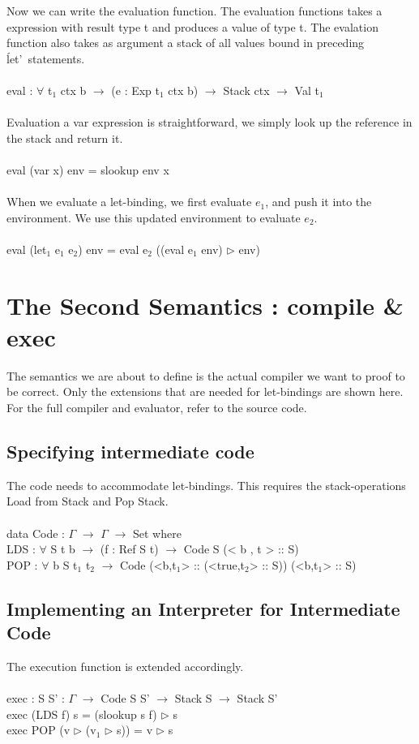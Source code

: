 \documentclass[paper=a4, fontsize=11pt]{scrartcl} %
\numberwithin{equation}{section} %
\numberwithin{figure}{section} %
\numberwithin{table}{section} %
\begin{document}
Now we can write the evaluation function. The evaluation functions takes a expression with result type t and produces a value of type t. The evalation function also takes as argument a stack of all values bound in preceding \'let'\ statements. \\
\ttfamily
\\eval : $\forall$ {t$_1$ ctx b} $\rightarrow$ (e : Exp t$_1$ ctx b) $\rightarrow$ Stack ctx $\rightarrow$ Val t$_1$\\
\normalfont
\\Evaluation a var expression is straightforward, we simply look up the reference in the stack and return it.\\
\ttfamily
\\eval (var x) env = slookup env x\\
\normalfont
\\When we evaluate a let-binding, we first evaluate $e_1$, and push it into the environment. We use this updated environment to evaluate $e_2$.\\
\normalfont
\ttfamily
\\eval (let$_1$ e$_1$ e$_2$) env = eval e$_2$ ((eval e$_1$ env) $\rhd$ env)\\
\normalfont

\section{The Second Semantics : compile \& exec}
The semantics we are about to define is the actual compiler we want to proof to be correct. Only the extensions that are needed for let-bindings are shown here. For the full compiler and evaluator, refer to the source code.
\subsection{Specifying intermediate code}
The code needs to accommodate let-bindings. This requires the stack-operations Load from Stack and Pop Stack.\\
\\
\ttfamily
data Code : $\Gamma$ $\rightarrow$ $\Gamma$ $\rightarrow$ Set where\\
	LDS   : $\forall$ {S t b} $\rightarrow$ (f : Ref S t) $\rightarrow$ Code S (< b , t > :: S)\\
    POP   : $\forall$ {b S t$_1$ t$_2$} $\rightarrow$ Code (<b,t$_1$> :: (<true,t$_2$> :: S)) (<b,t$_1$> :: S)\\
\normalfont

\subsection{Implementing an Interpreter for Intermediate Code}
The execution function is extended accordingly.\\
\\
\ttfamily
exec : {S S' : $\Gamma$} $\rightarrow$ Code S S' $\rightarrow$ Stack S $\rightarrow$ Stack S'\\
exec (LDS f) s = (slookup s f) $\rhd$ s\\
exec POP (v $\rhd$ (v$_1$ $\rhd$ s)) = v $\rhd$ s\\
\normalfont
\end{document}
